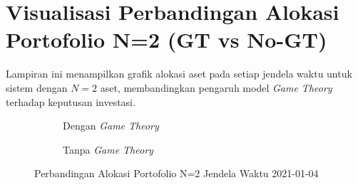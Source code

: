 \chapter{Visualisasi Perbandingan Alokasi Portofolio N=2 (GT vs No-GT)}
\label{appendix:window_analysis_n2}

Lampiran ini menampilkan grafik alokasi aset pada setiap jendela waktu untuk sistem dengan $N=2$ aset, membandingkan pengaruh model \textit{Game Theory} terhadap keputusan investasi.

\begin{figure}[!htbp]\centering\begin{subfigure}[b]{0.48\textwidth}\centering


\caption{Dengan \textit{Game Theory}}\end{subfigure}\hfill\begin{subfigure}[b]{0.48\textwidth}\centering


\caption{Tanpa \textit{Game Theory}}\end{subfigure}\caption{Perbandingan Alokasi Portofolio N=2 Jendela Waktu 2021-01-04}\label{fig:window_2021_01_04}\end{figure}

% 
% 
% 
% 

% 
% 
% 
% 


